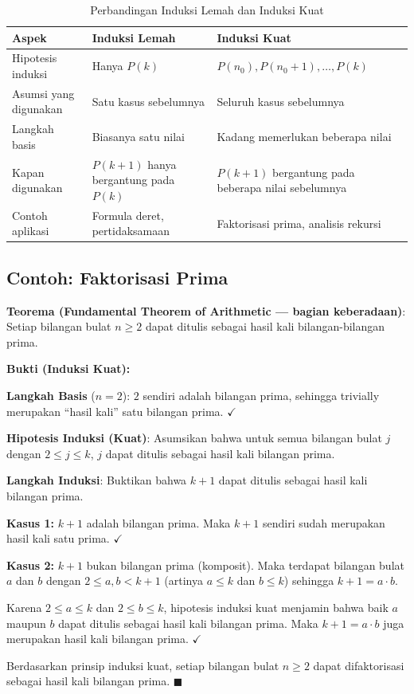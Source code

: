 \begin{table}[htbp]
\centering
\footnotesize
\renewcommand{\arraystretch}{1.3}
\begin{tabular}{|>{\raggedright\arraybackslash}p{2.8cm}|>{\raggedright\arraybackslash}p{4.2cm}|>{\raggedright\arraybackslash}p{4.2cm}|}
\hline
\textbf{Aspek} & \textbf{Induksi Lemah} & \textbf{Induksi Kuat} \\ \hline
Hipotesis induksi & Hanya $P(k)$ & $P(n_0), P(n_0{+}1), \ldots, P(k)$ \\ \hline
Asumsi yang digunakan & Satu kasus sebelumnya & Seluruh kasus sebelumnya \\ \hline
Langkah basis & Biasanya satu nilai & Kadang memerlukan beberapa nilai \\ \hline
Kapan digunakan & $P(k+1)$ hanya bergantung pada $P(k)$ & $P(k+1)$ bergantung pada beberapa nilai sebelumnya \\ \hline
Contoh aplikasi & Formula deret, pertidaksamaan & Faktorisasi prima, analisis rekursi \\ \hline
\end{tabular}
\caption{Perbandingan Induksi Lemah dan Induksi Kuat}
\end{table}

\subsection{Contoh: Faktorisasi Prima}

\begin{contoh}
\textbf{Teorema (Fundamental Theorem of Arithmetic --- bagian keberadaan)}: Setiap bilangan bulat $n \geq 2$ dapat ditulis sebagai hasil kali bilangan-bilangan prima.

\textbf{Bukti (Induksi Kuat):}

\textbf{Langkah Basis} ($n = 2$):
$2$ sendiri adalah bilangan prima, sehingga trivially merupakan ``hasil kali'' satu bilangan prima. $\checkmark$

\textbf{Hipotesis Induksi (Kuat)}: Asumsikan bahwa untuk semua bilangan bulat $j$ dengan $2 \leq j \leq k$, $j$ dapat ditulis sebagai hasil kali bilangan prima.

\textbf{Langkah Induksi}: Buktikan bahwa $k + 1$ dapat ditulis sebagai hasil kali bilangan prima.

\textbf{Kasus 1:} $k + 1$ adalah bilangan prima. Maka $k+1$ sendiri sudah merupakan hasil kali satu prima. $\checkmark$

\textbf{Kasus 2:} $k + 1$ bukan bilangan prima (komposit). Maka terdapat bilangan bulat $a$ dan $b$ dengan $2 \leq a, b < k + 1$ (artinya $a \leq k$ dan $b \leq k$) sehingga $k + 1 = a \cdot b$.

Karena $2 \leq a \leq k$ dan $2 \leq b \leq k$, hipotesis induksi kuat menjamin bahwa baik $a$ maupun $b$ dapat ditulis sebagai hasil kali bilangan prima. Maka $k + 1 = a \cdot b$ juga merupakan hasil kali bilangan prima. $\checkmark$

Berdasarkan prinsip induksi kuat, setiap bilangan bulat $n \geq 2$ dapat difaktorisasi sebagai hasil kali bilangan prima. $\blacksquare$
\end{contoh}

